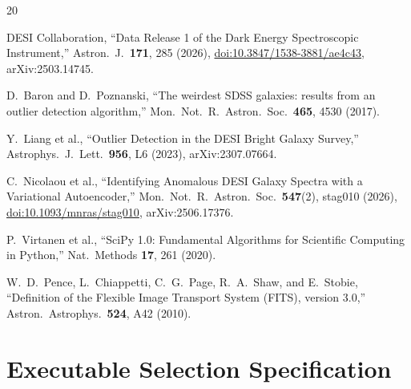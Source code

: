 \documentclass[twocolumn]{aastex701}
\begin{document}
\begin{thebibliography}{20}

DESI Collaboration, ``Data Release 1 of the Dark Energy Spectroscopic Instrument,''
Astron.\ J.\ \textbf{171}, 285 (2026),
\href{https://doi.org/10.3847/1538-3881/ae4c43}{doi:10.3847/1538-3881/ae4c43},
arXiv:2503.14745.

D.\ Baron and D.\ Poznanski, ``The weirdest SDSS galaxies: results from an outlier detection
algorithm,'' Mon.\ Not.\ R.\ Astron.\ Soc.\ \textbf{465}, 4530 (2017).

Y.\ Liang et al., ``Outlier Detection in the DESI Bright Galaxy Survey,''
Astrophys.\ J.\ Lett.\ \textbf{956}, L6 (2023), arXiv:2307.07664.

C.\ Nicolaou et al., ``Identifying Anomalous DESI Galaxy Spectra with a Variational Autoencoder,''
Mon.\ Not.\ R.\ Astron.\ Soc.\ \textbf{547}(2), stag010 (2026),
\href{https://doi.org/10.1093/mnras/stag010}{doi:10.1093/mnras/stag010},
arXiv:2506.17376.

P.\ Virtanen et al., ``SciPy 1.0: Fundamental Algorithms for Scientific Computing in Python,''
Nat.\ Methods \textbf{17}, 261 (2020).

W.\ D.\ Pence, L.\ Chiappetti, C.\ G.\ Page, R.\ A.\ Shaw, and E.\ Stobie,
``Definition of the Flexible Image Transport System (FITS), version 3.0,''
Astron.\ Astrophys.\ \textbf{524}, A42 (2010).

\end{thebibliography}

\clearpage
\appendix

\section{Executable Selection Specification}\label{app:selection}
\end{document}
